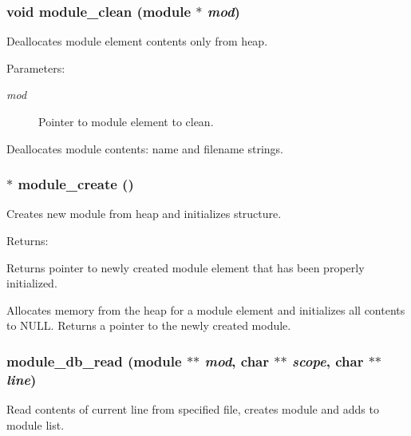 \subsubsection{\setlength{\rightskip}{0pt plus 5cm}void module\_\-clean ({\bf module} $\ast$ {\em mod})}\label{module_8h_a7}


Deallocates module element contents only from heap.

\begin{Desc}
\item[Parameters: ]\par
\begin{description}
\item[{\em 
mod}]Pointer to module element to clean.\end{description}
\end{Desc}
Deallocates module contents: name and filename strings. 
\subsubsection{$\ast$ module\_\-create ()}\label{module_8h_a1}


Creates new module from heap and initializes structure.

\begin{Desc}
\item[Returns: ]\par
Returns pointer to newly created module element that has been properly initialized.\end{Desc}
Allocates memory from the heap for a module element and initializes all contents to NULL. Returns a pointer to the newly created module. 
\subsubsection{ module\_\-db\_\-read ({\bf module} $\ast$$\ast$ {\em mod}, char $\ast$$\ast$ {\em scope}, char $\ast$$\ast$ {\em line})}\label{module_8h_a4}


Read contents of current line from specified file, creates module and adds to module list.

